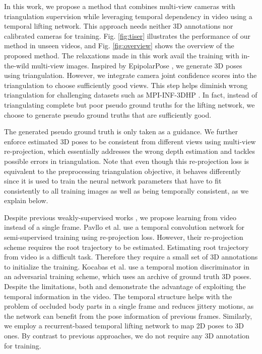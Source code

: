 \documentclass[10pt,twocolumn,letterpaper]{article}
\begin{document}
In this work, we propose a method that combines multi-view cameras with triangulation supervision while leveraging temporal dependency in video using a temporal lifting network. This approach needs neither 3D annotations nor calibrated cameras for training. Fig. \ref{fig:tiser} illustrates the performance of our method in unseen videos, and  Fig. \ref{fig:overview} shows the overview of the proposed method. The relaxations made in this work avail the training with in-the-wild multi-view images. Inspired by EpipolarPose \cite{Kocabas_2019_CVPR}, we generate 3D poses using triangulation. However, we integrate camera joint confidence scores into the triangulation to choose sufficiently good views. This step helps diminish wrong triangulation for challenging datasets such as MPI-INF-3DHP \cite{mehta2017monocular}. In fact, instead of triangulating complete but poor pseudo ground truths for the lifting network, we choose to generate pseudo ground truths that are sufficiently good.

The generated pseudo ground truth is only taken as a guidance. We further enforce estimated 3D poses to be consistent from different views using multi-view re-projection, which essentially addresses the wrong depth estimation and tackles possible errors in triangulation.
Note that even though this re-projection loss is equivalent to the preprocessing triangulation objective, it behaves differently since it is used to train the neural network parameters that have to fit consistently to all training images as well as being temporally consistent, as we explain below.

Despite previous weakly-supervised works \cite{Kocabas_2019_CVPR, Iqbal_2020_CVPR, wandt2020canonpose}, we propose learning from video instead of a single frame. Pavllo et al. \cite{Pavllo_2019_CVPR} use a temporal convolution network for semi-supervised training using re-projection loss. However, their re-projection scheme requires the root trajectory to be estimated. Estimating root trajectory from video is a difficult task. Therefore they require a small set of 3D annotations to initialize the training. Kocabas et al. \cite{Kocabas_2020_CVPR} use a temporal motion discriminator in an adversarial training scheme, which uses an archive of ground truth 3D poses. Despite the limitations, both \cite{Pavllo_2019_CVPR} and \cite{Kocabas_2020_CVPR} demonstrate the advantage of exploiting the temporal information in the video. The temporal structure helps with the problem of occluded body parts in a single frame and reduces jittery motions, as the network can benefit from the pose information of previous frames. Similarly, we employ a recurrent-based temporal lifting network to map 2D poses to 3D ones. By contrast to previous approaches, we do not require any 3D annotation for training.
\end{document}
